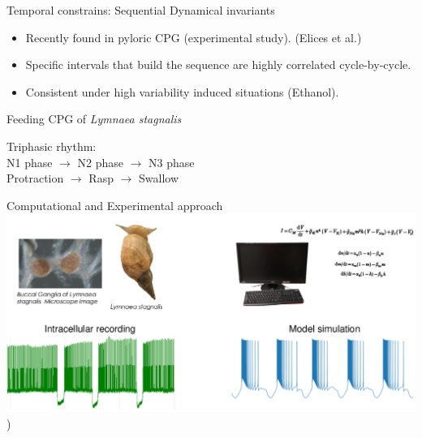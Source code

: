 \documentclass[aspectratio=43]{beamer}
\begin{document}
\begin{frame}{Temporal constrains: Sequential Dynamical invariants}

		\begin{itemize}
			\item<1->Recently found in pyloric CPG (experimental study). (Elices et al.)
			\item<1->Specific intervals that build the sequence are highly correlated cycle-by-cycle.
			\item<1->Consistent under high variability induced situations (Ethanol).
		\end{itemize}
	\vspace{5pt}
	\centering


\end{frame}

\begin{frame}{Feeding CPG of \textit{Lymnaea stagnalis}}

	Triphasic rhythm:
	\\
	\centering
	N1 phase $\rightarrow$ N2 phase $\rightarrow$ N3 phase \\
	Protraction $\rightarrow$ Rasp $\rightarrow$ Swallow\\
	\vspace{10pt}
	
	\centering

\end{frame}



\begin{frame}{Computational and Experimental approach}
	\includegraphics[width=\textwidth]{Images/experimental-computational.pdf})
\end{frame}
\end{document}
